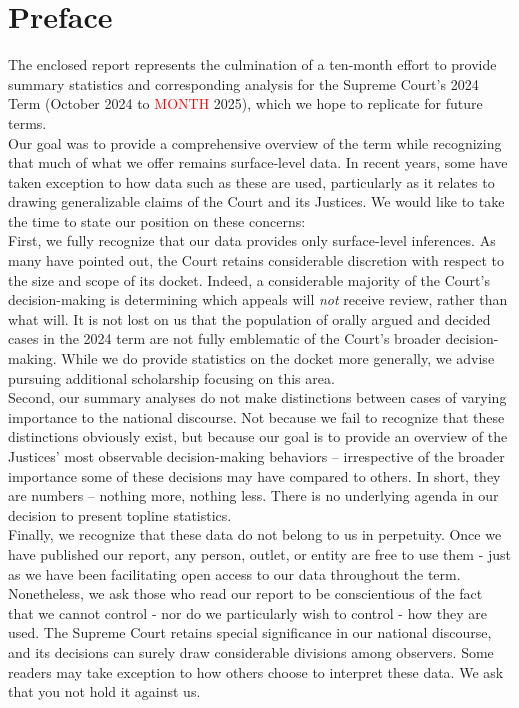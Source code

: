 \newpage
\section{Preface}

\large
\noindent The enclosed report represents the culmination of a ten-month effort to provide summary statistics and corresponding analysis for the Supreme Court's 2024 Term (October 2024 to \textcolor{red}{MONTH} 2025), which we hope to replicate for future terms. \\

\noindent Our goal was to provide a comprehensive overview of the term while recognizing that much of what we offer remains surface-level data. In recent years, some have taken exception to how data such as these are used, particularly as it relates to drawing generalizable claims of the Court and its Justices. We would like to take the time to state our position on these concerns: \\

\noindent First, we fully recognize that our data provides only surface-level inferences. As many have pointed out, the Court retains considerable discretion with respect to the size and scope of its docket. Indeed, a considerable majority of the Court's decision-making is determining which appeals will \emph{not} receive review, rather than what will. It is not lost on us that the population of orally argued and decided cases in the 2024 term are not fully emblematic of the Court's broader decision-making. While we do provide statistics on the docket more generally, we advise pursuing additional scholarship focusing on this area.\\

\noindent Second, our summary analyses do not make distinctions between cases of varying importance to the national discourse. Not because we fail to recognize that these distinctions obviously exist, but because our goal is to provide an overview of the Justices' most observable decision-making behaviors -- irrespective of the broader importance some of these decisions may have compared to others. In short, they are numbers -- nothing more, nothing less. There is no underlying agenda in our decision to present topline statistics. \\

\noindent Finally, we recognize that these data do not belong to us in perpetuity. Once we have published our report, any person, outlet, or entity are free to use them - just as we have been facilitating open access to our data throughout the term. Nonetheless, we ask those who read our report to be conscientious of the fact that we cannot control - nor do we particularly wish to control - how they are used. The Supreme Court retains special significance in our national discourse, and its decisions can surely draw considerable divisions among observers. Some readers may take exception to how others choose to interpret these data. We ask that you not hold it against us. \\

